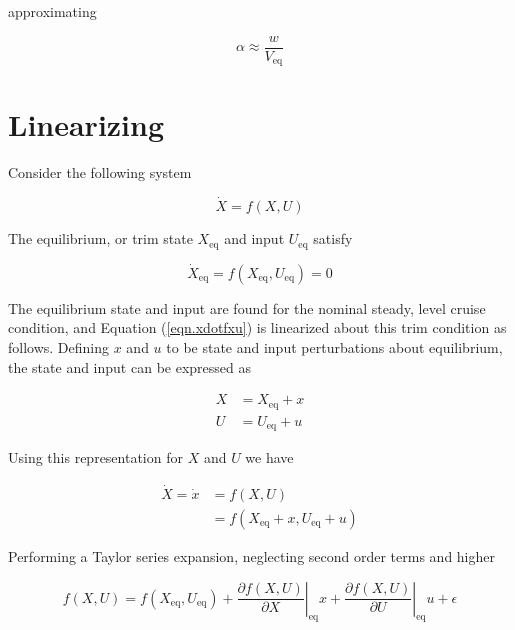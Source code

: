 approximating

\begin{equation*}
  \alpha \approx \frac{w}{V_{\text{eq}}}
\end{equation*}

\section{Linearizing}

Consider the following system

\begin{equation}
  \label{eqn.xdotfxu}
  \dot{X}=f({X},U)
\end{equation}

The equilibrium, or trim state $X_{\text{eq}}$ and input $U_{\text{eq}}$ satisfy

\begin{equation}
  \label{eqn.eqptdef}
  \dot{X}_{\text{eq}}=f({X}_{\text{eq}},U_{\text{eq}})=0
\end{equation}

The equilibrium state and input are found for the nominal steady, level cruise condition, and Equation (\ref{eqn.xdotfxu}) is linearized about this trim condition as follows.
Defining $x$ and $u$ to be state and input perturbations about equilibrium, the state and input can be expressed as

\begin{equation*}
  \begin{split}
    X&=X_{\text{eq}}+x \\
    U&=U_{\text{eq}}+u
  \end{split}
\end{equation*}

Using this representation for $X$ and $U$ we have

\begin{equation*}
  \begin{split}
    \dot{X}=\dot{x}&=f(X, U) \\
    &=f(X_{\text{eq}}+x,U_{\text{eq}}+u)
  \end{split}
\end{equation*}

Performing a Taylor series expansion, neglecting second order terms and higher

\begin{equation*}
  f(X,U)= f(X_{\text{eq}},U_{\text{eq}})+\left.\frac{\partial{}f(X,U)}{\partial{}X}\right|_{\text{eq}}x+\left.\frac{\partial{}f(X,U)}{\partial{}U}\right|_{\text{eq}}u+\epsilon
\end{equation*}

